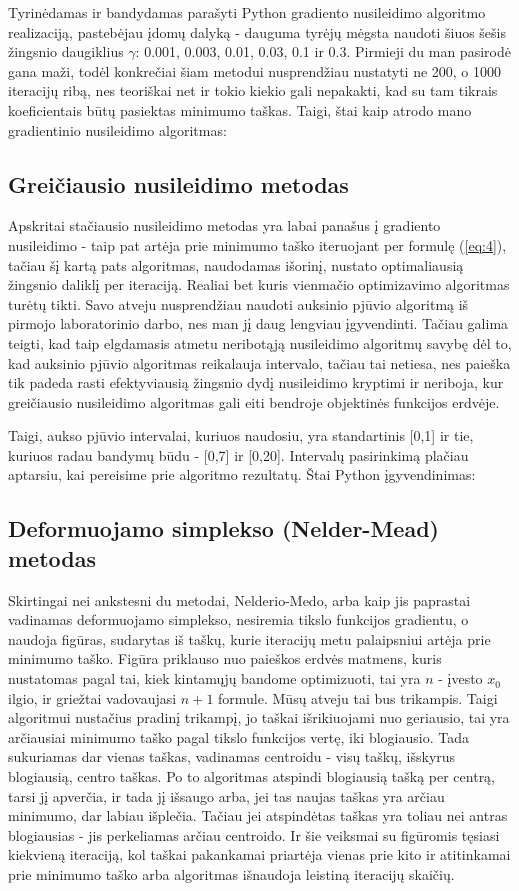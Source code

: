 \documentclass{article}
\begin{document}
Tyrinėdamas ir bandydamas parašyti Python gradiento nusileidimo algoritmo realizaciją, pastebėjau įdomų dalyką - dauguma tyrėjų mėgsta naudoti šiuos šešis žingsnio daugiklius $\gamma$: 0.001, 0.003, 0.01, 0.03, 0.1 ir 0.3. Pirmieji du man pasirodė gana maži, todėl konkrečiai šiam metodui nusprendžiau nustatyti ne 200, o 1000 iteracijų ribą, nes teoriškai net ir tokio kiekio gali nepakakti, kad su tam tikrais koeficientais būtų pasiektas minimumo taškas. Taigi, štai kaip atrodo mano gradientinio nusileidimo algoritmas:
\subsection{Greičiausio nusileidimo metodas}
Apskritai stačiausio nusileidimo metodas yra labai panašus į gradiento nusileidimo - taip pat artėja prie minimumo taško iteruojant per formulę (\ref{eq:4}), tačiau šį kartą pats algoritmas, naudodamas išorinį, nustato optimaliausią žingsnio daliklį per iteraciją. Realiai bet kuris vienmačio optimizavimo algoritmas turėtų tikti. Savo atveju nusprendžiau naudoti auksinio pjūvio algoritmą iš pirmojo laboratorinio darbo, nes man jį daug lengviau įgyvendinti. Tačiau galima teigti, kad taip elgdamasis atmetu neribotąją nusileidimo algoritmų savybę dėl to, kad auksinio pjūvio algoritmas reikalauja intervalo, tačiau tai netiesa, nes paieška tik padeda rasti efektyviausią žingsnio dydį nusileidimo kryptimi ir neriboja, kur greičiausio nusileidimo algoritmas gali eiti bendroje objektinės funkcijos erdvėje.

Taigi, aukso pjūvio intervalai, kuriuos naudosiu, yra standartinis [0,1] ir tie, kuriuos radau bandymų būdu - [0,7] ir [0,20]. Intervalų pasirinkimą plačiau aptarsiu, kai pereisime prie algoritmo rezultatų. Štai Python įgyvendinimas:
\subsection{Deformuojamo simplekso (Nelder-Mead) metodas}
Skirtingai nei ankstesni du metodai, Nelderio-Medo, arba kaip jis paprastai vadinamas deformuojamo simplekso, nesiremia tikslo funkcijos gradientu, o naudoja figūras, sudarytas iš taškų, kurie iteracijų metu palaipsniui artėja prie minimumo taško. Figūra priklauso nuo paieškos erdvės matmens, kuris nustatomas pagal tai, kiek kintamųjų bandome optimizuoti, tai yra $n$ - įvesto $x_{0}$ ilgio, ir griežtai vadovaujasi $n+1$ formule. Mūsų atveju tai bus trikampis. Taigi algoritmui nustačius pradinį trikampį, jo taškai išrikiuojami nuo geriausio, tai yra arčiausiai minimumo taško pagal tikslo funkcijos vertę, iki blogiausio. Tada sukuriamas dar vienas taškas, vadinamas centroidu - visų taškų, išskyrus blogiausią, centro taškas. Po to algoritmas atspindi blogiausią tašką per centrą, tarsi jį apverčia, ir tada jį išsaugo arba, jei tas naujas taškas yra arčiau minimumo, dar labiau išplečia. Tačiau jei atspindėtas taškas yra toliau nei antras blogiausias - jis perkeliamas arčiau centroido. Ir šie veiksmai su figūromis tęsiasi kiekvieną iteraciją, kol taškai pakankamai priartėja vienas prie kito ir atitinkamai prie minimumo taško arba algoritmas išnaudoja leistiną iteracijų skaičių.
\end{document}

